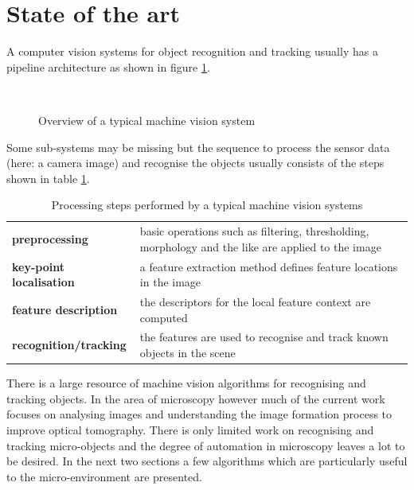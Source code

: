 \documentclass[a4paper,12pt]{book}
\begin{document}
\section{State of the art}
A computer vision systems for object recognition and tracking usually
has a pipeline architecture as shown in figure \ref{fig:overview}.
\begin{figure}[htbp]
   \begin{center}
     \\
     \caption{Overview of a typical machine vision system\label{fig:overview}}
   \end{center}
\end{figure}
Some sub-systems may be missing but the sequence to process the sensor data
(here: a camera image) and recognise the objects usually consists of the
steps shown in table \ref{tbl:steps}.
\begin{table}[htbp]
  \begin{center}
    \caption{Processing steps performed by a typical machine vision
      systems\label{tbl:steps}} %
    \begin{tabular}{ll}\toprule
      {\bf preprocessing}              & \parbox[t]{.6\textwidth}{basic operations such as filtering, thresholding, morphology and the like are applied to the image}\\
      {\bf key-point localisation} & \parbox[t]{.6\textwidth}{a feature extraction method defines feature locations in the image}\\
      {\bf feature description}     & \parbox[t]{.6\textwidth}{the descriptors for the local feature context are computed}\\
      {\bf recognition/tracking}    & \parbox[t]{.6\textwidth}{the features are used to recognise and track known objects in the scene}\\\bottomrule
    \end{tabular}
  \end{center}
\end{table}
There is a large resource of machine vision algorithms for recognising and
tracking objects. In the area of microscopy however
much of the current work focuses on analysing images and understanding the
image formation process to improve optical tomography.
There is only limited work on recognising and tracking micro-objects
and the degree of automation in microscopy leaves a lot to be desired. In the
next two sections a few algorithms which are particularly useful to the
micro-environment are presented.
\end{document}
